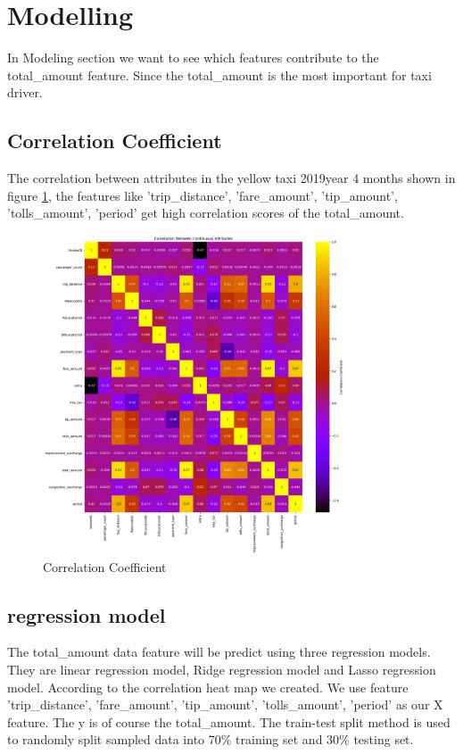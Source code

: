 \documentclass[11pt]{article}
\begin{document}
\section{Modelling}

In Modeling section we want to see which features contribute to the total\_amount feature. Since the total\_amount is the most important for taxi driver.

\subsection{Correlation Coefficient}
The correlation between attributes in the yellow taxi 2019year 4 months shown in figure \ref{fig:image9}, the features like 'trip\_distance', 'fare\_amount', 'tip\_amount', 'tolls\_amount', 'period' get high correlation scores of the total\_amount.

\begin{figure}[!h]
    \centering
    \includegraphics[width=0.8\textwidth]{plots/p10.png}
    \caption{Correlation Coefficient} %
    \label{fig:image9}
\end{figure}

\subsection{regression model}
The  total\_amount data feature will be predict using three regression models. They are linear regression model, Ridge regression model and Lasso regression model. According to the correlation heat map we created. We use feature 'trip\_distance', 'fare\_amount', 'tip\_amount', 'tolls\_amount', 'period' as our X feature. The y is of course the total\_amount.  The train-test split method is used to randomly split sampled data into 70\% training set and 30\% testing set.
\end{document}
